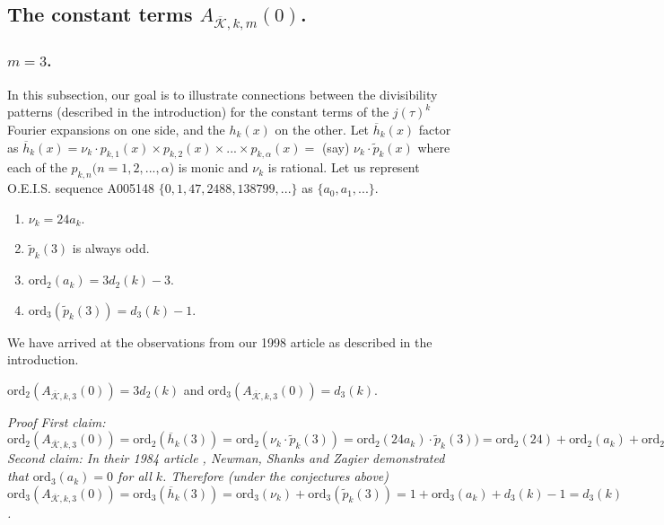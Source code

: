 \documentclass{article}
\begin{document}
\subsection[]{The constant terms 
$A_{\overline{\mathcal{K}},k,m}(0)$.
} 
\subsubsection[]{$m = 3$.}
In this subsection, our goal is to illustrate
connections between the divisibility
patterns (described in the
introduction)
for the constant terms of the
$j(\tau)^k$ Fourier expansions 
on one side,
and the $h_k(x)$ on the other.
Let $\overline{h}_k(x)$ factor as 
$\overline{h}_k(x) = 
\nu_k\cdot p_{k,1}(x) \times p_{k,2}(x) \times ...
\times p_{k,\alpha}(x) =$
(say)
$\nu_k\cdot \tilde{p}_k(x)$
where each of the $p_{k,n} (n = 1, 2,...,
\alpha$) is monic and $\nu_k$
is rational. 
Let us represent O.E.I.S.
sequence A005148 \cite{OEISNewmanShanks}  
$\{0, 1, 47, 2488, 138799, ...\}$
as $\{a_0, a_1, ...\}$.
\begin{conjecture}
\begin{enumerate}
\item
$\nu_k = 24a_k$.
\item $\tilde{p}_k(3)$
is always odd.
\item
$\text{ord}_2(a_k) = 3d_2(k)-3$.
\item
$\text{ord}_3(\tilde{p}_k(3)) = 
d_3(k) - 1$.
\end{enumerate}
\end{conjecture} \noindent
We have arrived at the observations from
our 1998 article as described in the introduction.
\begin{corollary}
$\text{ord}_2(A_{\overline{\mathcal{K}},k,3}(0)) = 
3d_2(k)$
and
$\text{ord}_3(A_{\overline{\mathcal{K}},k,3}(0)) = d_3(k)$.
\end{corollary} \noindent
\it{Proof} \rm \thinspace
First claim:
$\text{ord}_2(A_{\overline{\mathcal{K}},k,3}(0)) =
\text{ord}_2(\overline{h}_k(3)) =
\text{ord}_2(\nu_k \cdot \tilde{p}_k(3)) =
\text{ord}_2(24 a_k) \cdot \tilde{p}_k(3)) =
\text{ord}_2(24) + \text{ord}_2(a_k)+ 
\text{ord}_2(\tilde{p}_k(3)) =
3 + 3d_2(k)-3 + 0 = 3d_2(k).$
 Second claim:
In their 1984 article 
\cite{newman2004sequence},
Newman, Shanks and Zagier demonstrated
that
$\text{ord}_3(a_k) = 0$
for all $k$.
Therefore (under the conjectures above)
$\text{ord}_3(A_{\overline{\mathcal{K}},k,3}(0))
=\text{ord}_3(\overline{h}_k(3)) =
\text{ord}_3(\nu_k) +
\text{ord}_3(\tilde{p}_k(3)) =
1 + \text{ord}_3(a_k) + d_3(k) - 1 =
d_3(k)$.
\end{document}
